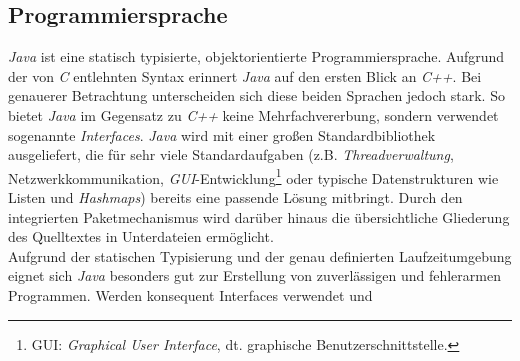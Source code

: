     \subsection{Programmiersprache}
        \emph{Java} ist eine statisch typisierte, objektorientierte Programmiersprache. Aufgrund der von 
        \emph{C} entlehnten Syntax erinnert \emph{Java} auf den ersten Blick an \emph{C++}. Bei genauerer 
        Betrachtung unterscheiden sich diese beiden Sprachen jedoch stark. So bietet \emph{Java} im Gegensatz zu 
        \emph{C++} keine Mehrfachvererbung, sondern verwendet sogenannte \emph{Interfaces}. \emph{Java} wird mit einer 
        großen Standardbibliothek ausgeliefert, die für sehr viele Standardaufgaben
        (z.B. \emph{Threadverwaltung}, Netzwerkkommunikation, \emph{GUI}-Entwicklung\footnote{GUI: 
         \emph{Graphical User Interface}, dt.  graphische Benutzerschnittstelle.} oder typische Datenstrukturen wie Listen und
         \emph{Hashmaps}) bereits eine
        passende Lösung mitbringt. Durch den integrierten Paketmechanismus wird darüber hinaus die übersichtliche
        Gliederung des Quelltextes in Unterdateien ermöglicht.\\
        Aufgrund der statischen Typisierung und der genau definierten Laufzeitumgebung eignet sich \emph{Java} besonders
        gut zur Erstellung von zuverlässigen und fehlerarmen Programmen. Werden konsequent Interfaces verwendet und
